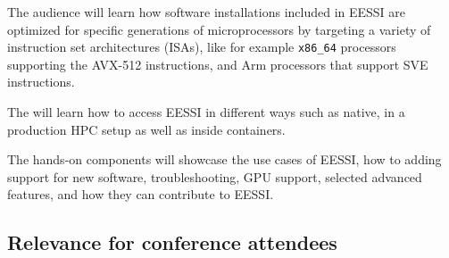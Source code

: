 The audience will learn how software installations included in EESSI are optimized for specific generations
of microprocessors by targeting a
variety of instruction set architectures (ISAs), like for example \texttt{x86\_64} processors supporting the
AVX-512 instructions, and Arm processors that support SVE instructions.

The will learn how to access EESSI in different ways such as native, in a production HPC setup as well as inside
containers.

The hands-on components will showcase the use cases of EESSI, how to adding support for new software,
troubleshooting, GPU support, selected advanced features, and how they can contribute to EESSI.

\subsection*{Relevance for conference attendees}

